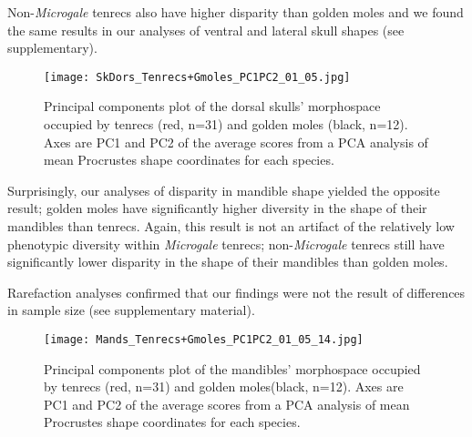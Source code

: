 \documentclass[12pt,a4paper]{article}
\begin{document}
Non-\textit{Microgale} tenrecs also have higher disparity than golden moles and we found the same results in our analyses of ventral and lateral skull shapes (see supplementary).




	
\begin{figure}[H]
\centering
\texttt{[image: SkDors\_Tenrecs+Gmoles\_PC1PC2\_01\_05.jpg]}
\caption{Principal components plot of the dorsal skulls' morphospace occupied by tenrecs (red, n=31) and golden moles (black, n=12). Axes are PC1 and PC2 of the average scores from a PCA analysis of mean Procrustes shape coordinates for each species. }
\label{skdorsPCA}
\end{figure}


Surprisingly, our analyses of disparity in mandible shape yielded the opposite result; golden moles have significantly higher diversity in the shape of their mandibles than tenrecs.  
Again, this result is not an artifact of the relatively low phenotypic diversity within \textit{Microgale} tenrecs; non-\textit{Microgale} tenrecs still have significantly lower disparity in the shape of their mandibles than golden moles.

Rarefaction analyses confirmed that our findings were not the result of differences in sample size (see supplementary material).


\begin{figure}[H]
\centering
\texttt{[image: Mands\_Tenrecs+Gmoles\_PC1PC2\_01\_05\_14.jpg]}
\caption{Principal components plot of the mandibles' morphospace occupied by tenrecs (red, n=31) and golden moles(black, n=12). Axes are PC1 and PC2 of the average scores from a PCA analysis of mean Procrustes shape coordinates for each species. }
\label{mandsPCA}

\end{figure}
\end{document}
